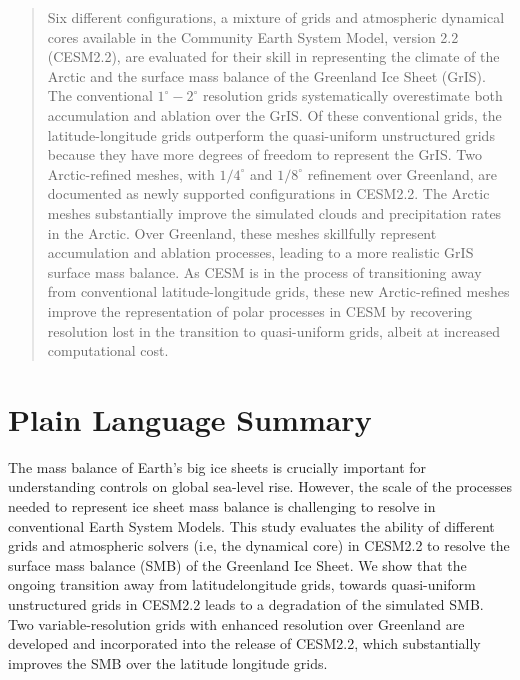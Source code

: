 \documentclass[draft]{agujournal2019}
\begin{document}

\begin{abstract}

Six different configurations, a mixture of grids and atmospheric dynamical cores available in the Community Earth System Model, version 2.2 (CESM2.2), are evaluated for their skill in representing the climate of the Arctic and the surface mass balance of the Greenland Ice Sheet (GrIS). The conventional $1^{\circ}-2^{\circ}$ resolution grids systematically overestimate both accumulation and ablation over the GrIS. Of these conventional grids, the latitude-longitude grids outperform the quasi-uniform unstructured grids because they have more degrees of freedom to represent the GrIS. Two Arctic-refined meshes, with $1/4^{\circ}$ and $1/8^{\circ}$ refinement over Greenland, are documented as newly supported configurations in CESM2.2. The Arctic meshes substantially improve the simulated clouds and precipitation rates in the Arctic. Over Greenland, these meshes skillfully represent accumulation and ablation processes, leading to a more realistic GrIS surface mass balance. As CESM is in the process of transitioning away from conventional latitude-longitude grids, these new Arctic-refined meshes improve the representation of polar processes in CESM by recovering resolution lost in the transition to quasi-uniform grids, albeit at increased computational cost.

\end{abstract}

\section*{Plain Language Summary}

The mass balance of Earth's big ice sheets is crucially important for understanding controls on global sea-level rise. However, the scale of the processes needed to represent ice sheet mass balance is challenging to resolve in conventional Earth System Models. This study evaluates the ability of different grids and atmospheric solvers (i.e, the dynamical core) in CESM2.2 to resolve the surface mass balance (SMB) of the Greenland Ice Sheet. We show that the ongoing transition away from latitude{\color{blue}{-}}longitude grids, towards quasi-uniform unstructured grids in CESM2.2 leads to a degradation of the simulated SMB. Two variable-resolution grids with enhanced resolution over Greenland are developed and incorporated into the release of CESM2.2, which substantially improves the SMB over the latitude longitude grids.
\end{document}
